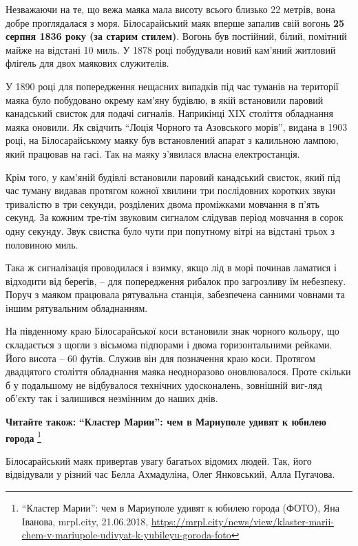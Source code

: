 Незважаючи на те, що вежа маяка мала висоту всього близько 22 метрів, вона
добре проглядалася з моря. Білосарайський маяк вперше запалив свій вогонь \textbf{25
серпня 1836 року (за старим стилем)}. Вогонь був постійний, білий, помітний
майже на відстані 10 миль. У 1878 році побудували новий кам'яний житловий
флігель для двох маякових служителів.


У 1890 році для попередження нещасних випадків під час туманів на території
маяка було побудовано окрему кам'яну будівлю, в якій встановили паровий
канадський свисток для подачі сигналів. Наприкінці XIX століття обладнання
маяка оновили. Як свідчить \enquote{Лоція Чорного та Азовського морів}, видана в 1903
році, на Білосарайському маяку був встановлений апарат з калильною лампою, який
працював на гасі. Так на маяку з'явилася власна електростанція.

Крім того, у кам'яній будівлі встановили паровий канадський свисток, який під
час туману видавав протягом кожної хвилини три послідовних коротких звуки
тривалістю в три секунди, розділених двома проміжками мовчання в п'ять секунд.
За кожним тре\hyp{}тім звуковим сигналом слідував період мовчання в сорок одну
секунду. Звук свистка було чути при попутному вітрі на відстані трьох з
половиною миль.

Така ж сигналізація проводилася і взимку, якщо лід в морі починав ламатися і
відходити від берегів, – для попередження рибалок про загрозливу їм небезпеку.
Поруч з маяком працювала рятувальна станція, забезпечена санними човнами та
іншим рятувальним обладнанням.

На південному краю Білосарайської коси встановили знак чорного кольору, що
складається з щогли з вісьмома підпорами і двома горизонтальними рейками. Його
висота – 60 футів. Служив він для позначення краю коси. Протягом двадцятого
століття обладнання маяка неодноразово оновлювалося. Проте скільки б у
подальшому не відбувалося технічних удосконалень, зовнішній виг\hyp{}ляд об'єкту так
і залишився незмінним до наших днів.

\textbf{Читайте також:} \textbf{\enquote{Кластер Марии}: чем в Мариуполе удивят к юбилею города}
\footnote{\enquote{Кластер Марии}: чем в Мариуполе удивят к юбилею города (ФОТО), Яна Іванова, mrpl.city, 21.06.2018, \url{https://mrpl.city/news/view/klaster-marii-chem-v-mariupole-udivyat-k-yubileyu-goroda-foto}}

Білосарайський маяк привертав увагу багатьох відомих людей. Так, його
відвідували у різний час Белла Ахмадуліна, Олег Янковський, Алла Пугачова.

